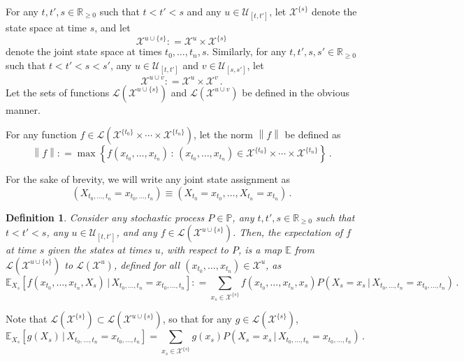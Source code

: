\documentclass[10pt]{paper}
\newtheorem{definition}{Definition}
\newcommand{\reals}{\mathbb{R}}
\newcommand{\realsnonneg}{\reals_{\geq 0}}
\newcommand{\states}{\mathcal{X}}
\newcommand{\processes}{\mathbb{P}}
\newcommand{\gambles}{\mathcal{L}}
\newcommand{\norm}[1]{\left\lVert #1 \right\rVert}
\newcommand{\coloneqq}{:\!=}
\begin{document}
For any $t,t',s\in\realsnonneg$ such that $t<t'<s$ and any $u\in\mathcal{U}_{[t,t']}$, let $\states^{\{s\}}$ denote the state space at time $s$, and let
\begin{equation*}
\states^{u\cup\{s\}} \coloneqq \states^u\times\states^{\{s\}}
\end{equation*}
denote the joint state space at times $t_0,\ldots,t_n,s$. Similarly, for any $t,t',s,s'\in\realsnonneg$ such that $t<t'<s<s'$, any $u\in\mathcal{U}_{[t,t']}$ and $v\in\mathcal{U}_{[s,s']}$, let
\begin{equation*}
\states^{u\cup v}\coloneqq\states^u\times\states^v\,.
\end{equation*}
Let the sets of functions $\gambles(\states^{u\cup\{s\}})$ and $\gambles(\states^{u\cup v})$ be defined in the obvious manner.

For any function $f\in\gambles(\states^{\{t_0\}}\times\cdots\times\states^{\{t_n\}})$, let the norm $\norm{f}$ be defined as
\begin{equation*}
\norm{f} \coloneqq \max\left\{ f(x_{t_0},\ldots,x_{t_n})\,:\,(x_{t_0},\ldots,x_{t_n})\in \states^{\{t_0\}}\times\cdots\times\states^{\{t_n\}}\right\}\,.
\end{equation*}

For the sake of brevity, we will write any joint state assignment as
\begin{equation*}
\left(X_{t_0,\ldots,t_n}=x_{t_0,\ldots,t_n}\right)\equiv (X_{t_0}=x_{t_0},\ldots,X_{t_n}=x_{t_n})\,.
\end{equation*}

\begin{definition}
Consider any stochastic process $P\in\processes$, any $t,t',s\in\realsnonneg$ such that $t<t'<s$, any $u\in\mathcal{U}_{[t,t']}$, and any $f\in\gambles(\states^{u\cup\{s\}})$. Then, the \emph{expectation of $f$ at time $s$ given the states at times $u$}, with respect to $P$, is a map $\mathbb{E}$ from $\gambles(\states^{u\cup\{s\}})$ to $\gambles(\states^u)$, defined for all $(x_{t_0},\ldots,x_{t_n})\in\states^u$, as
\begin{equation*}
\mathbb{E}_{X_s}[f(x_{t_0},\ldots,x_{t_n},X_s)\,\vert\,X_{t_0,\ldots,t_n}=x_{t_0,\ldots,t_n}] \coloneqq \sum_{x_s\in\states^{\{s\}}} f(x_{t_0},\ldots,x_{t_n},x_s)P(X_s=x_s\,\vert\,X_{t_0,\ldots,t_n}=x_{t_0,\ldots,t_n})\,.
\end{equation*}
\end{definition}
\noindent Note that $\gambles(\states^{\{s\}})\subset\gambles(\states^{u\cup\{s\}})$, so that for any $g\in\gambles(\states^{\{s\}})$,
\begin{equation*}
\mathbb{E}_{X_s}[g(X_s)\,\vert\,X_{t_0,\ldots,t_n}=x_{t_0,\ldots,t_n}] = \sum_{x_s\in\states^{\{s\}}} g(x_s)P(X_s=x_s\,\vert\,X_{t_0,\ldots,t_n}=x_{t_0,\ldots,t_n})\,.
\end{equation*}
\end{document}
